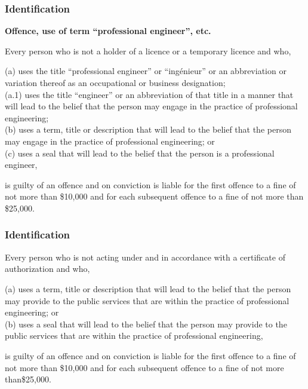 \begin{frame}
\frametitle{Identification}

\textbf{Offence, use of term ``professional engineer'', etc.}

Every person who is not a holder of a licence or a temporary licence and who,


      (a)	uses the title ``professional engineer'' or ``ing\'enieur'' or an abbreviation or
	variation thereof as an occupational or business designation;\\
      (a.1)	uses the title ``engineer'' or an abbreviation of that title in a
	manner that will lead to the belief that the person may 
	engage in the practice of professional engineering;\\
      (b)	uses a term, title or description that will lead to the belief 
	that the person may engage in the practice of professional 
	engineering; or\\
	        (c)	uses a seal that will lead to the belief that the person is a
			professional engineer,


	is guilty of an offence and on conviction is liable for the first offence to a fine of not more than \$10,000 and for each subsequent offence to a fine of not more than \$25,000.

\end{frame}



\begin{frame}
\frametitle{Identification}

Every person who is not acting under and in accordance with a certificate of authorization and who,


	    (a)	uses a term, title or description that will lead to the belief that the person
		may  provide to the public services that are within the practice of 
		professional engineering; or\\
	    (b) 	uses a seal that will lead to the belief that the person may provide to the
		public services that are within the practice of professional engineering,


	is guilty of an offence and on conviction is liable for the first offence to a fine of not more than \$10,000 and for each subsequent offence to a fine of not more than\$25,000. 

\end{frame}



